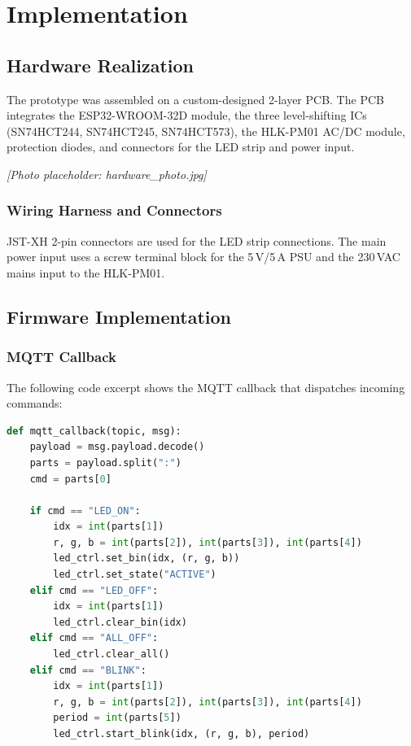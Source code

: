 \chapter{Implementation}
\label{ch:implementation}


\section{Hardware Realization}
\label{sec:hw-realization}

The prototype was assembled on a custom-designed 2-layer PCB. The PCB integrates the ESP32-WROOM-32D module, the three level-shifting ICs (SN74HCT244, SN74HCT245, SN74HCT573), the HLK-PM01 AC/DC module, protection diodes, and connectors for the LED strip and power input.

\textit{[Photo placeholder: hardware\_photo.jpg]}

\subsection{Wiring Harness and Connectors}
\label{sec:wiring-harness}

JST-XH 2-pin connectors are used for the LED strip connections. The main power input uses a screw terminal block for the 5\,V/5\,A PSU and the 230\,VAC mains input to the HLK-PM01.

\section{Firmware Implementation}
\label{sec:fw-implementation}

\subsection{MQTT Callback}
\label{sec:mqtt-callback}

The following code excerpt shows the MQTT callback that dispatches incoming commands:

\begin{lstlisting}[language=Python, caption=MQTT message callback, label=lst:mqtt-cb]
def mqtt_callback(topic, msg):
    payload = msg.payload.decode()
    parts = payload.split(":")
    cmd = parts[0]

    if cmd == "LED_ON":
        idx = int(parts[1])
        r, g, b = int(parts[2]), int(parts[3]), int(parts[4])
        led_ctrl.set_bin(idx, (r, g, b))
        led_ctrl.set_state("ACTIVE")
    elif cmd == "LED_OFF":
        idx = int(parts[1])
        led_ctrl.clear_bin(idx)
    elif cmd == "ALL_OFF":
        led_ctrl.clear_all()
    elif cmd == "BLINK":
        idx = int(parts[1])
        r, g, b = int(parts[2]), int(parts[3]), int(parts[4])
        period = int(parts[5])
        led_ctrl.start_blink(idx, (r, g, b), period)
\end{lstlisting}

